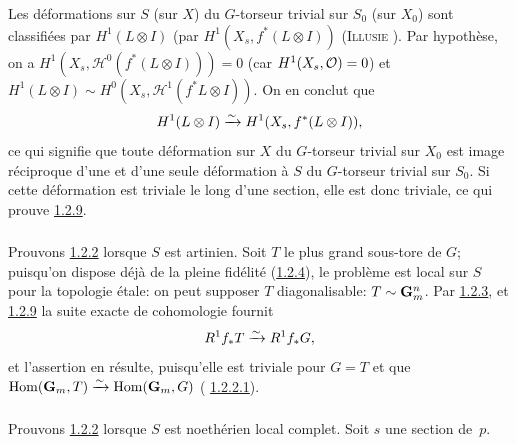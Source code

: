 \documentclass[10pt]{../fichiers-configuration-latex/smfart}
\begin{document}
Les déformations sur $S$ (\resp sur $X$) du $G$-torseur trivial sur
$S_{0}$ (\resp sur $X_{0}$) sont classifiées par $H^{1}(L\otimes I)$
(\resp par $H^{1}(X_{s},f^{\ast}(L\otimes I))$ (\textsc{Illusie}
\cite[VII~2.4.4~(ii)]{SGA4-18:3}).
Par hypothèse, on a $H^{1}(X_{s},ℋ^0(f^{\ast}(L\otimes
I)))=0$ (car $H^{1}(X_{s},{\mathcal O})=0$) et $H^{1}(L\otimes I)\sim
H^0(X_{s}, ℋ^{1}(f^{\ast}L\otimes I))$. On en conclut que
$$
H^{1}(L\otimes I)\xrightarrow{\sim} H^{1}(X_{s},f^{\ast}(L\otimes
I)){},
$$
ce qui signifie que toute déformation sur $X$ du $G$-torseur trivial
sur $X_{0}$ est image réciproque d'une et d'une seule déformation à
$S$ du $G$-torseur trivial sur $S_{0}$. Si cette déformation est
triviale le long d'une section, elle est donc triviale, ce qui prouve
\hyperref[XVIII.lem1.2.9]{1.2.9}.

\setcounter{subsubsection}{9}
\subsubsection{}
Prouvons \hyperref[XVIII.thm1.2.2]{1.2.2} lorsque $S$ est artinien. Soit $T$ le plus grand
sous-tore de $G$; puisqu'on dispose déjà de la pleine fidélité
(\hyperref[XVIII.lem1.2.4]{1.2.4}), le problème est local sur $S$ pour la
topologie étale: on 
peut supposer $T$ diagonalisable: $T\sim \mathbf{G}^{n}_{m}$. Par
\hyperref[XVIII.lem1.2.3]{1.2.3}, et \hyperref[XVIII.lem1.2.9]{1.2.9} la suite exacte de
cohomologie fournit 
$$
R^{1}f_{\ast}T\xrightarrow{\sim} R^{1}f_{\ast}G{},
$$
et l'assertion en résulte, puisqu'elle est triviale pour $G=T$ et que
$\operatorname{Hom}(\mathbf{G}_{m},T)\xrightarrow{\sim}\operatorname{Hom}(\mathbf{G}_{m},G)$ (\cf
\hyperref[XVIII.par1.2.2.1]{1.2.2.1}).

\subsubsection{}
Prouvons \hyperref[XVIII.thm1.2.2]{1.2.2} lorsque $S$ est noethérien local
complet. Soit $s$ une section de~$p$.
\end{document}
